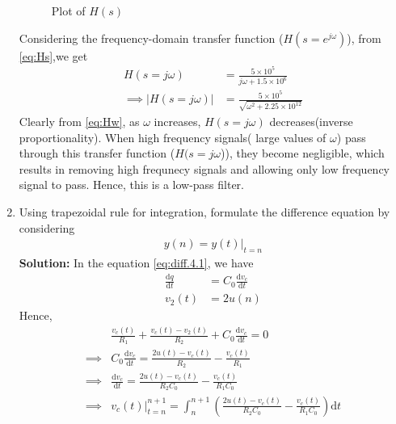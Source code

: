 \documentclass[journal,12pt,twocolumn]{IEEEtran}
\newcommand{\solution}{\noindent \textbf{Solution: }}
\providecommand{\brak}[1]{\ensuremath{\left(#1\right)}}
\providecommand{\der}[1]{\mathrm{d} #1}
\providecommand{\abs}[1]{\left\vert#1\right\vert}
\numberwithin{equation}{section}
\renewcommand\thesection{\arabic{section}}
\begin{document}
\begin{enumerate}[label=\thesection.\arabic*.,ref=\thesection.\theenumi]
\begin{figure}[!ht]
			\caption{Plot of $H(s)$}
			\label{fig-4.3}	
		\end{figure}
		Considering the frequency-domain transfer function ($H(s=e^{j\omega})$), from \eqref{eq:Hs},we get
		\begin{align}
			\label{eq:Hw}
			H(s=j\omega) &= \frac{5 \times 10^5}{j\omega + 1.5 \times 10^6} \\
			\implies \abs{H(s=j\omega)} &= \frac{5 \times 10^5}{\sqrt{\omega^2 + 2.25\times10^{12}}}
		\end{align}
		Clearly from \eqref{eq:Hw}, as $\omega$ increases, $H(s=j\omega)$ decreases(inverse proportionality). When high frequency signals( large values of $\omega$) pass through this transfer function ($H(s=j\omega$)), they become negligible, which results in removing high frequnecy signals and allowing only low frequency signal to pass. Hence, this is a low-pass filter.
		\item Using trapezoidal rule for integration, formulate the difference equation by considering 
		\begin{align}
			y(n) = y(t)\vert_{t=n}
		\end{align}
		\solution
		In the equation \eqref{eq:diff.4.1}, we have
		\begin{align}
			\frac{\der{q}}{\der{t}}&=C_0\frac{\der{v_c}}{\der{t}}\\
			v_2(t)&=2u(n)
		\end{align} 
		Hence,
		\begin{align}
			&\frac{v_c(t)}{R_1} + \frac{v_c(t) - v_2(t)}{R_2} + C_0\frac{\der{v_c}}{\der{t}} = 0 \\
			\implies &C_0\frac{\der{v_c}}{\der{t}} = \frac{2u(t)-v_c(t)}{R_2} - \frac{v_c(t)}{R_1} \\
			\implies &\frac{\der{v_c}}{\der{t}} = \frac{2u(t)-v_c(t)}{R_2 C_0} - \frac{v_c(t)}{R_1 C_0} \\
			\label{eq:trap}
			\implies &\left.v_c(t)\right|_{t=n}^{n+1} = \int_{n}^{n+1} \brak{\frac{2u(t)-v_c(t)}{R_2C_0} - \frac{v_c(t)}{R_1C_0}} \der{t}
		\end{align}
		

\end{enumerate}
\end{document}
